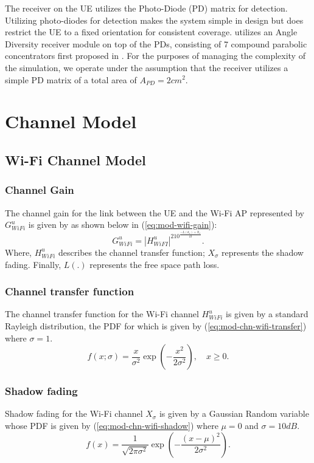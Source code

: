 The receiver on the UE utilizes the Photo-Diode (PD) matrix for detection. Utilizing photo-diodes for detection makes the system simple in design but does restrict the UE to a fixed orientation for consistent coverage. \cite{kazemi_novel_2024} utilizes an Angle Diversity receiver module on top of the PDs, consisting of 7 compound parabolic concentrators first proposed in \cite{sarbazi_design_2024}. For the purposes of managing the complexity of the simulation, we operate under the assumption that the receiver utilizes a simple PD matrix of a total area of $A_{PD}= 2cm^2$.
\section{Channel Model}
\label{sec:mod-channel}
\subsection{Wi-Fi Channel Model}
\label{subsec:mod-channel-rf}
\subsubsection{Channel Gain}
The channel gain for the link between the UE and the Wi-Fi AP represented by $ G_{WiFi}^u$ is given by  \cite{perahia_next_2013} as shown below in (\ref{eq:mod-wifi-gain}):
\begin{equation}
    G_{WiFi}^u = |H_{WiFI}^u|^210^{\frac{-L(d_u) + X_\sigma}{10}}.
    \label{eq:mod-wifi-gain}
\end{equation}
Where, $H_{WiFi}^u$ describes the channel transfer function; $X_\sigma$ represents the shadow fading. Finally, $L(.)$ represents the free space path loss.
\subsubsection{Channel transfer function}
The channel transfer function for the Wi-Fi channel $H_{WiFi}^u$  is given by a standard Rayleigh distribution, the PDF for which is given by (\ref{eq:mod-chn-wifi-transfer}) where $\sigma = 1$.
\begin{equation}
    f(x;\sigma )={\frac {x}{\sigma ^{2}}}\exp\left(-\frac{x^2}{2\sigma^2}\right),\quad x\geq 0.
    \label{eq:mod-chn-wifi-transfer}
\end{equation}
\subsubsection{Shadow fading}
Shadow fading for the Wi-Fi channel $X_\sigma$ is given by a Gaussian Random variable whose PDF is given by (\ref{eq:mod-chn-wifi-shadow}) where $\mu = 0$ and $\sigma = 10{dB}$.
\begin{equation}
    f(x) = \frac{1}{\sqrt{2\pi\sigma^2}} \exp\left(-\frac{(x - \mu)^2}{2\sigma^2}\right).
    \label{eq:mod-chn-wifi-shadow}
\end{equation}
